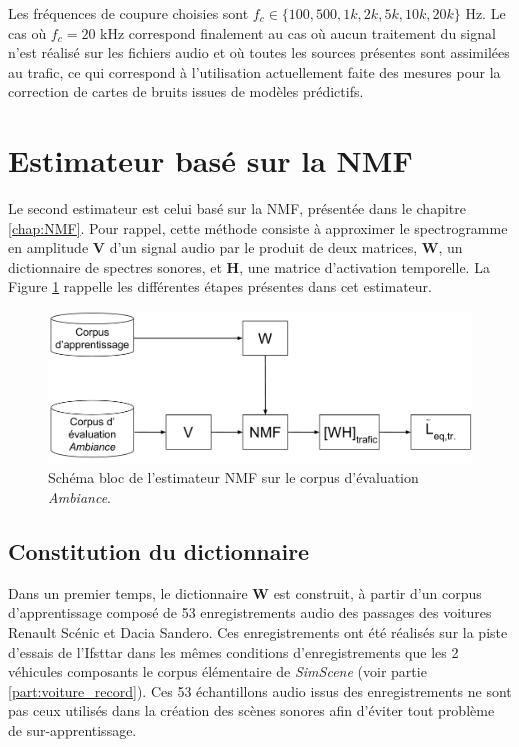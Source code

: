 Les fréquences de coupure choisies sont $f_c \in \lbrace 100, 500, 1k, 2k, 5k, 10k, 20k \rbrace$ Hz. Le cas où $f_c = 20$ kHz correspond finalement au cas où aucun traitement du signal n'est réalisé sur les fichiers audio et où toutes les sources présentes sont assimilées au trafic, ce qui correspond à l'utilisation actuellement faite des mesures pour la correction de cartes de bruits issues de modèles prédictifs.


\section{Estimateur basé sur la NMF}
Le second estimateur est celui basé sur la NMF, présentée dans le chapitre \ref{chap:NMF}. Pour rappel, cette méthode consiste à approximer le spectrogramme en amplitude $\mathbf{V}$ d'un signal audio par le produit de deux matrices, $\mathbf{W}$, un dictionnaire de spectres sonores, et $\mathbf{H}$, une matrice d'activation temporelle. La Figure \ref{fig:nmf_ambiance} rappelle les différentes étapes présentes dans cet estimateur.

\begin{figure}[ht]
\centering
\includegraphics[width=0.7\linewidth]{./figures/NMF/NMF_ambiance.pdf}
\caption{Schéma bloc de l'estimateur NMF sur le corpus d'évaluation \textit{Ambiance}.}
\label{fig:nmf_ambiance}
\end{figure}


\subsection{Constitution du dictionnaire}\label{part:W_design}

Dans un premier temps, le dictionnaire $\mathbf{W}$ est construit, à partir d'un corpus d'apprentissage composé de 53  enregistrements audio des passages des voitures Renault Scénic et Dacia Sandero. Ces enregistrements ont été réalisés sur la piste d'essais de l'Ifsttar dans les mêmes conditions d'enregistrements que les 2 véhicules composants le corpus élémentaire de \textit{SimScene} (voir partie \ref{part:voiture_record}). Ces 53 échantillons audio issus des enregistrements ne sont pas ceux utilisés dans la création des scènes sonores afin d'éviter tout problème de sur-apprentissage.

